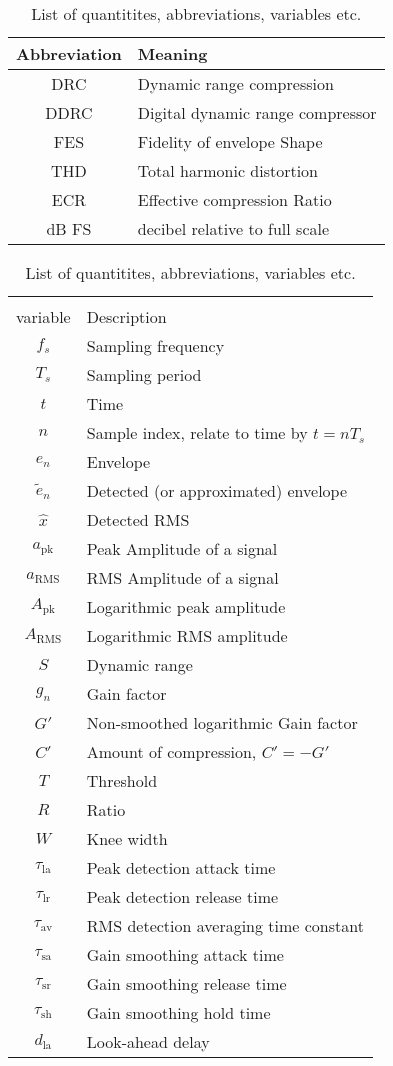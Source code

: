 \documentclass[../main2.tex]{subfiles}
\begin{document}
\begin{table}[h]
\begin{center}
\caption{List of quantitites, abbreviations, variables etc.}
\label{tab:list_of_quantities}
\begin{tabular}{| c | l |}
	\hline
	Abbreviation & Meaning \\ \hline
	DRC & Dynamic range compression \\
	DDRC & Digital dynamic range compressor \\
	FES & Fidelity of envelope Shape \\
	THD & Total harmonic distortion \\
	ECR & Effective compression Ratio \\
	dB FS & decibel relative to full scale \\ 
	\hline
\end{tabular}
\end{center}
\begin{center}
\begin{tabular}{| c | l |}
	\hline
	\tblbox{Quantity/\\variable} & Description \\ \hline
	$f_s$ & Sampling frequency \\
	$T_s$ & Sampling period \\
	$t$ & Time \\
	$n$ & Sample index, relate to time by $t = nT_s$ \\
	$e_n$ & Envelope \\
	$\tilde{e}_n$ & Detected (or approximated) envelope\\
	$\hat{x}$ & Detected RMS \\
	$a_\text{pk}$ & Peak Amplitude of a signal \\
	$a_\text{RMS}$ & RMS Amplitude of a signal \\
	$A_\text{pk}$ & Logarithmic peak amplitude\\
	$A_\text{RMS}$ & Logarithmic RMS amplitude\\
	$S$ & Dynamic range\\
	$g_n$ & Gain factor\\
	$G'$ & Non-smoothed logarithmic Gain factor\\
	$C'$ & Amount of compression, $C' = -G'$ \\
	$T$ & Threshold\\
	$R$ & Ratio \\
	$W$ & Knee width \\
	$\tau_\text{la}$ & Peak detection attack time \\
	$\tau_\text{lr}$ & Peak detection release time \\
	$\tau_\text{av}$ & RMS detection averaging time constant\\
	$\tau_\text{sa}$ & Gain smoothing attack time \\
	$\tau_\text{sr}$ & Gain smoothing release time \\
	$\tau_\text{sh}$ & Gain smoothing hold time \\
	$d_\text{la}$ & Look-ahead delay \\
	\hline
\end{tabular}
\end{center}

\end{table}
\end{document}

